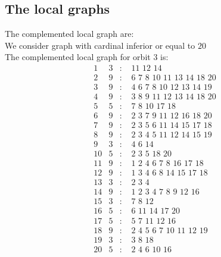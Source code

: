 \documentclass[12pt]{article}
\begin{document}
\subsection{The local graphs}
The complemented local graph are:\\
We consider graph with cardinal inferior or equal to $20$\\
The complemented local graph for orbit $3$ is:
\begin{equation*}
\begin{array}{rrcl}
1&3&:&\,\,11\,\,12\,\,14\\
2&9&:&\,\,6\,\,7\,\,8\,\,10\,\,11\,\,13\,\,14\,\,18\,\,20\\
3&9&:&\,\,4\,\,6\,\,7\,\,8\,\,10\,\,12\,\,13\,\,14\,\,19\\
4&9&:&\,\,3\,\,8\,\,9\,\,11\,\,12\,\,13\,\,14\,\,18\,\,20\\
5&5&:&\,\,7\,\,8\,\,10\,\,17\,\,18\\
6&9&:&\,\,2\,\,3\,\,7\,\,9\,\,11\,\,12\,\,16\,\,18\,\,20\\
7&9&:&\,\,2\,\,3\,\,5\,\,6\,\,11\,\,14\,\,15\,\,17\,\,18\\
8&9&:&\,\,2\,\,3\,\,4\,\,5\,\,11\,\,12\,\,14\,\,15\,\,19\\
9&3&:&\,\,4\,\,6\,\,14\\
10&5&:&\,\,2\,\,3\,\,5\,\,18\,\,20\\
11&9&:&\,\,1\,\,2\,\,4\,\,6\,\,7\,\,8\,\,16\,\,17\,\,18\\
12&9&:&\,\,1\,\,3\,\,4\,\,6\,\,8\,\,14\,\,15\,\,17\,\,18\\
13&3&:&\,\,2\,\,3\,\,4\\
14&9&:&\,\,1\,\,2\,\,3\,\,4\,\,7\,\,8\,\,9\,\,12\,\,16\\
15&3&:&\,\,7\,\,8\,\,12\\
16&5&:&\,\,6\,\,11\,\,14\,\,17\,\,20\\
17&5&:&\,\,5\,\,7\,\,11\,\,12\,\,16\\
18&9&:&\,\,2\,\,4\,\,5\,\,6\,\,7\,\,10\,\,11\,\,12\,\,19\\
19&3&:&\,\,3\,\,8\,\,18\\
20&5&:&\,\,2\,\,4\,\,6\,\,10\,\,16\\
\end{array}
\end{equation*}
\end{document}

